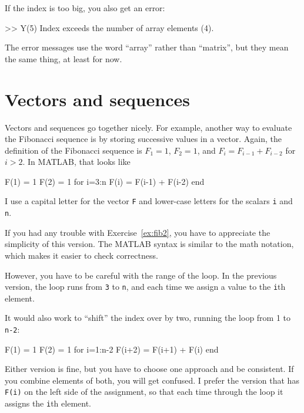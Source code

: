\documentclass[
]{book}
\numberwithin{Answer}{chapter}
\numberwithin{Exercise}{chapter}
\begin{document}
If the index is too big, you also get an error:

\begin{code}
>> Y(5)
Index exceeds the number of array elements (4).
\end{code}

The error messages use the word ``array'' rather than ``matrix'', but they mean the same thing, at least for now.



\section{Vectors and sequences}


Vectors and sequences go together nicely.
For example, another way to evaluate the Fibonacci sequence is by
storing successive values in a vector.  Again, the definition of the
Fibonacci sequence is $F_1 = 1$, $F_2 = 1$, and $F_{i} = F_{i-1} +
F_{i-2}$ for $i > 2$.  In MATLAB, that looks like

\begin{code}
F(1) = 1
F(2) = 1
for i=3:n
    F(i) = F(i-1) + F(i-2)
end
\end{code}

I use a capital letter for the vector {\tt F}
and lower-case letters for the scalars {\tt i} and {\tt n}.

If you had any trouble with Exercise~\ref{ex:fib2}, you have to
appreciate the simplicity of this version.  The MATLAB syntax is
similar to the math notation, which makes it easier to check
correctness.  


However, you have to be careful with the range of the loop.
In the previous version, the loop runs from {\tt 3} to {\tt n},
and each time we assign a value to the {\tt i}th element.  

It would also work to ``shift'' the index over by two,
running the loop from 1 to {\tt n-2}:

\begin{code}
F(1) = 1
F(2) = 1
for i=1:n-2
    F(i+2) = F(i+1) + F(i)
end
\end{code}

Either version is fine, but you have to choose one approach
and be consistent.  If you combine elements of both, you will
get confused.  I prefer the version that has {\tt F(i)} on the
left side of the assignment, so that each time through the loop
it assigns the {\tt i}th element.
\end{document}
